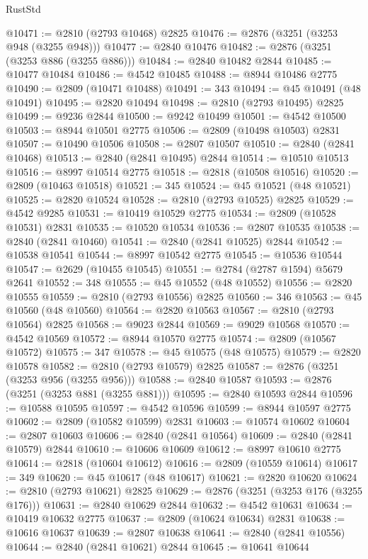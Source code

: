 \begin{lexlean}{RustStd}
\begin{coremodule}
@10471 := @2810 (@2793 @10468) @2825
@10476 := @2876 (@3251 (@3253 @948 (@3255 @948)))
@10477 := @2840 @10476
@10482 := @2876 (@3251 (@3253 @886 (@3255 @886)))
@10484 := @2840 @10482 @2844
@10485 := @10477 @10484
@10486 := @4542 @10485
@10488 := @8944 @10486 @2775
@10490 := @2809 (@10471 @10488)
@10491 := 343
@10494 := @45 @10491 (@48 @10491)
@10495 := @2820 @10494
@10498 := @2810 (@2793 @10495) @2825
@10499 := @9236 @2844
@10500 := @9242 @10499
@10501 := @4542 @10500
@10503 := @8944 @10501 @2775
@10506 := @2809 (@10498 @10503) @2831
@10507 := @10490 @10506
@10508 := @2807 @10507
@10510 := @2840 (@2841 @10468)
@10513 := @2840 (@2841 @10495) @2844
@10514 := @10510 @10513
@10516 := @8997 @10514 @2775
@10518 := @2818 (@10508 @10516)
@10520 := @2809 (@10463 @10518)
@10521 := 345
@10524 := @45 @10521 (@48 @10521)
@10525 := @2820 @10524
@10528 := @2810 (@2793 @10525) @2825
@10529 := @4542 @9285
@10531 := @10419 @10529 @2775
@10534 := @2809 (@10528 @10531) @2831
@10535 := @10520 @10534
@10536 := @2807 @10535
@10538 := @2840 (@2841 @10460)
@10541 := @2840 (@2841 @10525) @2844
@10542 := @10538 @10541
@10544 := @8997 @10542 @2775
@10545 := @10536 @10544
@10547 := @2629 (@10455 @10545)
@10551 := @2784 (@2787 @1594) @5679 @2641
@10552 := 348
@10555 := @45 @10552 (@48 @10552)
@10556 := @2820 @10555
@10559 := @2810 (@2793 @10556) @2825
@10560 := 346
@10563 := @45 @10560 (@48 @10560)
@10564 := @2820 @10563
@10567 := @2810 (@2793 @10564) @2825
@10568 := @9023 @2844
@10569 := @9029 @10568
@10570 := @4542 @10569
@10572 := @8944 @10570 @2775
@10574 := @2809 (@10567 @10572)
@10575 := 347
@10578 := @45 @10575 (@48 @10575)
@10579 := @2820 @10578
@10582 := @2810 (@2793 @10579) @2825
@10587 := @2876 (@3251 (@3253 @956 (@3255 @956)))
@10588 := @2840 @10587
@10593 := @2876 (@3251 (@3253 @881 (@3255 @881)))
@10595 := @2840 @10593 @2844
@10596 := @10588 @10595
@10597 := @4542 @10596
@10599 := @8944 @10597 @2775
@10602 := @2809 (@10582 @10599) @2831
@10603 := @10574 @10602
@10604 := @2807 @10603
@10606 := @2840 (@2841 @10564)
@10609 := @2840 (@2841 @10579) @2844
@10610 := @10606 @10609
@10612 := @8997 @10610 @2775
@10614 := @2818 (@10604 @10612)
@10616 := @2809 (@10559 @10614)
@10617 := 349
@10620 := @45 @10617 (@48 @10617)
@10621 := @2820 @10620
@10624 := @2810 (@2793 @10621) @2825
@10629 := @2876 (@3251 (@3253 @176 (@3255 @176)))
@10631 := @2840 @10629 @2844
@10632 := @4542 @10631
@10634 := @10419 @10632 @2775
@10637 := @2809 (@10624 @10634) @2831
@10638 := @10616 @10637
@10639 := @2807 @10638
@10641 := @2840 (@2841 @10556)
@10644 := @2840 (@2841 @10621) @2844
@10645 := @10641 @10644

\end{coremodule}
\end{lexlean}
